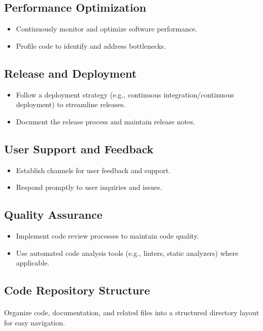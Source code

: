 \documentclass{article}
\begin{document}
\subsection{Performance Optimization}
\begin{itemize}
    \item Continuously monitor and optimize software performance.
    \item Profile code to identify and address bottlenecks.
\end{itemize}

\subsection{Release and Deployment}
\begin{itemize}
    \item Follow a deployment strategy (e.g., continuous integration/continuous
        deployment) to streamline releases.
    \item Document the release process and maintain release notes.
\end{itemize}

\subsection{User Support and Feedback}
\begin{itemize}
    \item Establish channels for user feedback and support.
    \item Respond promptly to user inquiries and issues.
\end{itemize}

\subsection{Quality Assurance}
\begin{itemize}
    \item Implement code review processes to maintain code quality.
    \item Use automated code analysis tools (e.g., linters, static analyzers) where applicable.
\end{itemize}

\subsection{Code Repository Structure}
\paragraph{}
Organize code, documentation, and related files into a structured directory layout for easy navigation.
\end{document}
